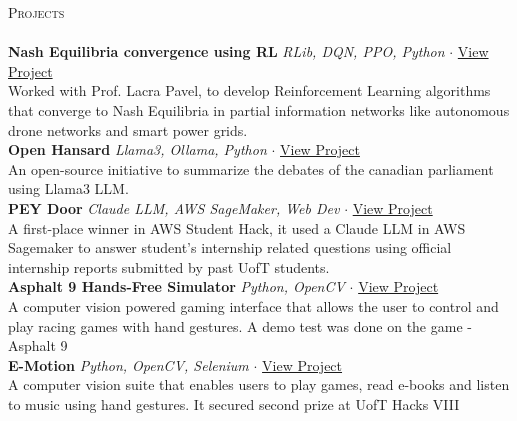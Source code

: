 \documentclass[a4paper]{article}
\newcommand{\lineunder} {
    \vspace*{-8pt} \\
    \hspace*{-18pt} \hrulefill \\
}
\newcommand{\header} [1] {
    {\hspace*{-18pt}\vspace*{6pt} \textsc{#1}}
    \vspace*{-6pt} \lineunder
}
\begin{document}
\header{Projects}
{\textbf{Nash Equilibria convergence using RL}} {\sl RLib, DQN, PPO, Python} $\cdot$ \href{https://github.com/BoundlessDevelopment/Capstone-Project}{View Project}\\
Worked with Prof. Lacra Pavel, to develop Reinforcement Learning algorithms that converge to Nash Equilibria in partial information networks
 like autonomous drone networks and smart power grids.\\
\vspace*{1mm}
{\textbf{Open Hansard}} {\sl Llama3, Ollama, Python} $\cdot$ \href{https://github.com/pandyah5/open-hansard}{View Project}\\
An open-source initiative to summarize the debates of the canadian parliament using Llama3 LLM.\\
\vspace*{1mm}
{\textbf{PEY Door}} {\sl Claude LLM, AWS SageMaker, Web Dev} $\cdot$ \href{https://devpost.com/software/peydoor}{View Project}\\
A first-place winner in AWS Student Hack, it used a Claude LLM in AWS Sagemaker to answer student's internship related questions using official internship reports submitted by past UofT students.\\
\vspace*{1mm}
{\textbf{Asphalt 9 Hands-Free Simulator}} {\sl Python, OpenCV} $\cdot$ \href{https://github.com/pandyah5/asphalt9_OpenCV_Simulation?tab=readme-ov-file}{View Project} \\
A computer vision powered gaming interface that allows the user to control and play racing games with hand gestures. A demo test was done on the game - Asphalt 9\\
\vspace*{1mm}
{\textbf{E-Motion}} {\sl Python, OpenCV, Selenium} $\cdot$ \href{https://devpost.com/software/e-motion-otbl2i}{View Project} \\
A computer vision suite that enables users to play games, read e-books and listen to music using hand gestures. It secured second prize at UofT Hacks VIII\\
\end{document}
